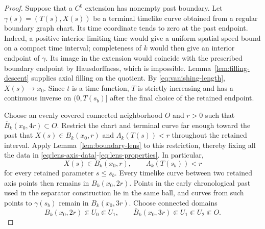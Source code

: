 \documentclass[10pt,a4paper]{article}
\numberwithin{equation}{section}
\theoremstyle{definition}
\theoremstyle{remark}
\begin{document}
\begin{proof}
Suppose that a $C^0$ extension has nonempty past boundary.  Let
$\gamma(s)=(T(s),X(s))$ be a terminal timelike curve obtained from a regular
boundary graph chart.  Its time coordinate tends to zero at the past
endpoint.  Indeed, a positive interior limiting time would give a uniform
spatial speed bound on a compact time interval; completeness of $k$ would
then give an interior endpoint of $\gamma$.  Its image in the extension
would coincide with the prescribed boundary endpoint by Hausdorffness,
which is impossible.  Lemma~\ref{lem:filling-descent} supplies axial filling
on the quotient.  By \eqref{eq:vanishing-length}, $X(s)\to x_0$.  Since $t$
is a time function, $T$ is strictly increasing and has a continuous inverse
on $(0,T(s_b)]$ after the final choice of the retained endpoint.

Choose an evenly covered connected neighborhood $O$ and $r>0$ such that
$\overline B_k(x_0,4r)\subset O$.  Restrict the chart and terminal curve far
enough toward the past that $X(s)\in B_k(x_0,r)$ and
$\Lambda_k(T(s))<r$ throughout the retained interval.  Apply
Lemma~\ref{lem:boundary-lens} to this restriction, thereby fixing all
the data in \eqref{eq:lens-axis-data}-\eqref{eq:lens-properties}.  In
particular,
\begin{equation}
 X(s)\in B_k(x_0,r),\qquad
 \Lambda_k(T(s_b))<r
 \label{eq:short-terminal}
\end{equation}
for every retained parameter $s\le s_b$.  Every timelike curve between two
retained axis points then remains in $B_k(x_0,2r)$.  Points in the early
chronological past used in the separator construction lie in the same ball,
and curves from such points to $\gamma(s_b)$ remain in $B_k(x_0,3r)$.
Choose connected domains
\begin{equation}
 B_k(x_0,2r)\Subset U_0\Subset U_1,\qquad
 \overline B_k(x_0,3r)\Subset U_1\Subset U_2\Subset O.
 \label{eq:germ-domains}
\end{equation}


\end{proof}
\end{document}
